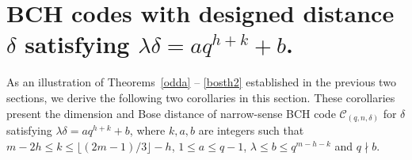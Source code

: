 \documentclass[journal,onecolumn]{IEEEtran}
\begin{document}
 \section{BCH codes with designed distance \texorpdfstring{$\delta  $ } \  satisfying \texorpdfstring{$\lambda \delta = aq^{h+k}+b$. } \ }\label{illustration} 

 As an illustration of   Theorems~\ref{odda} -- \ref{bosth2} established in the previous two sections, we  derive the following two corollaries in this section. These corollaries present the dimension and Bose distance of narrow-sense BCH code
 $\mathcal{C}_{(q,n,\delta)}$ for 
 $\delta$ satisfying  $\lambda \delta = a q^{h+k} + b$, where $k,a,b$ are integers such that $m - 2h \leq k \leq \lfloor (2m - 1)/3 \rfloor - h$, $1 \leq a \leq q - 1$, $\lambda \leq b \leq q^{m - h - k}$  and $q \nmid b$.
 
\end{document}
